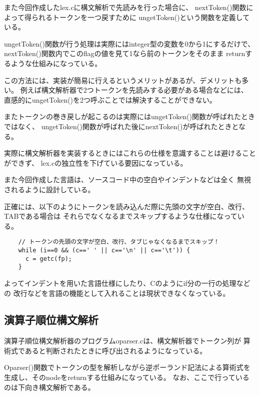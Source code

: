 \documentclass[11pt,a4j]{jarticle}
\begin{document}
また今回作成したlex.cに構文解析で先読みを行った場合に、
nextToken()関数によって得られるトークンを一つ戻すために
ungetToken()という関数を定義している。

ungetToken()関数が行う処理は実際にはinteger型の変数を0から1にするだけで、
nextToken()関数内でこのflagの値を見て1なら前のトークンをそのまま
returnするような仕組みになっている。

この方法には、実装が簡易に行えるというメリットがあるが、デメリットも多い。
例えば構文解析器で2つトークンを先読みする必要がある場合などには、
直感的にungetToken()を2つ呼ぶことでは解決することができない。

またトークンの巻き戻しが起こるのは実際にはungetToken()関数が呼ばれたときではなく、
ungetToken()関数が呼ばれた後にnextToken()が呼ばれたときとなる。

実際に構文解析器を実装するときにはこれらの仕様を意識することは避けることができず、
lex.cの独立性を下げている要因になっている。


\vspace{0.2in}

また今回作成した言語は、ソースコード中の空白やインデントなどは全く
無視されるように設計している。

正確には、以下のようにトークンを読み込んだ際に先頭の文字が空白、改行、TABである場合は
それらでなくなるまでスキップするような仕様になっている。

\begin{verbatim}
    // トークンの先頭の文字が空白、改行、タブじゃなくなるまでスキップ！
    while (i==0 && (c==' ' || c=='\n' || c=='\t')) {
      c = getc(fp);
    }
\end{verbatim}

よってインデントを用いた言語仕様にしたり、Cのようにif分の一行の処理などの
改行などを言語の機能として入れることは現状できなくなっている。


\subsection{演算子順位構文解析}

演算子順位構文解析器のプログラムoparser.cは、構文解析器でトークン列が
算術式であると判断されたときに呼び出されるようになっている。

Oparser()関数でトークンの型を解析しながら逆ポーランド記法による算術式を
生成し、そのnodeをreturnする仕組みになっている。
なお、ここで行っているのは下向き構文解析である。
\end{document}
